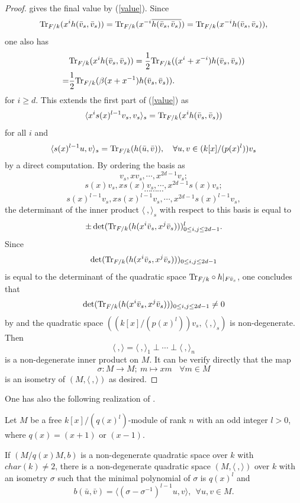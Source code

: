 \documentclass[12pt]{amsart}
\begin{document}
\begin{proof}
 gives the final value by (\ref{value}). Since 
 $${\rm Tr}_{F/k} (x^{i} h(\bar v_s, \bar v_s) ) = {\rm Tr}_{F/k} (x^{-i} \overline{h(\bar v_s, \bar v_s)} ) = {\rm Tr}_{F/k} (x^{-i} h(\bar v_s, \bar v_s) ), $$ one also has 
 $$\begin{aligned}  & {\rm Tr}_{F/k} (x^{i} h(\bar v_s, \bar v_s) ) =   \frac{1}{2} {\rm Tr}_{F/k} ((x^{i}+x^{-i}) h(\bar v_s, \bar v_s) ) \\
 = & \frac{1}{2} {\rm Tr}_{F/k} (\beta(x+x^{-1})h(\bar v_s, \bar v_s) ). \end{aligned} $$ for $i\geq d$. This extends the first part of (\ref{value}) as 
 $$\langle x^i s(x)^{l-1} v_s, v_s \rangle_s=  {\rm Tr}_{F/k} (x^{i} h(\bar v_s, \bar v_s) ) $$ for all $i$ and
 $$\langle s(x)^{l-1} u, v \rangle_s=  {\rm Tr}_{F/k} (h(\bar u, \bar v) ),   \ \ \ \forall u, v\in (k[x]/(p(x)^l) )v_s $$ by a direct computation.  By ordering the basis as 
 $$ v_s, x v_s, \cdots, x^{2d-1} v_s;$$
 $$ s(x)v_s, xs(x)v_s, \cdots, x^{2d-1} s(x)v_s; $$
 $$\cdots \cdots \cdots $$
 $$s(x)^{l-1}v_s, x s(x)^{l-1}v_s, \cdots, x^{2d-1}s(x)^{l-1}v_s  , $$
 the determinant of the inner product $\langle \ , \rangle_s$ with respect to this basis is equal to 
 $$ \pm \det( {\rm Tr}_{F/k} (h(x^i \bar v_s, x^j \bar v_s) ))_{0\leq i, j \leq 2d-1} ^l . $$ Since $$\det( {\rm Tr}_{F/k} (h(x^i \bar v_s, x^j \bar v_s) ))_{0\leq i, j \leq 2d-1} $$ is equal to the determinant of the quadratic space ${\rm Tr}_{F/k} \circ h|_{F \bar v_s}$, one concludes that 
 $$\det( {\rm Tr}_{F/k} (h(x^i \bar v_s, x^j \bar v_s) ))_{0\leq i, j \leq 2d-1}  \neq 0 $$ by \cite[Lemma 1.2]{Mil} and the quadratic space $((k[x]/(p(x)^l) )v_s, \ \langle \ , \rangle_s)$ is non-degenerate.  Then 
 $$\langle \ , \rangle = \langle \ , \rangle_1 \perp \cdots \perp \langle \ , \rangle_n $$ is a non-degenerate inner product on $M$.  It can be verify directly that the map 
 $$\sigma: M \longrightarrow M; \ m \mapsto x m \ \ \ \ \forall m\in M$$ is an isometry of $(M, \langle \ , \rangle )$ as desired. 
\end{proof}

One has also the following realization of \cite[Theorem 3.4]{Mil}.

\begin{prop}\label{real-odd}  Let $M$ be a free $k[x]/(q(x)^l)$-module of rank $n$ with an odd integer $l>0$, where $q(x)=(x+1)$ or $(x-1)$.

If $(M/q(x) M, b)$ is a non-degenerate quadratic space over $k$ with $char(k)\neq 2$, there is a non-degenerate quadratic space $(M, \langle \ , \rangle)$ over $k$ with an isometry $\sigma$ such that the minimal polynomial of $\sigma$ is $q(x)^l$ and 
$$ b (\bar u, \bar v) = \langle (\sigma- \sigma^{-1})^{l-1} u, v \rangle , \ \ \forall u, v \in M .$$
\end{prop}
\end{document}
